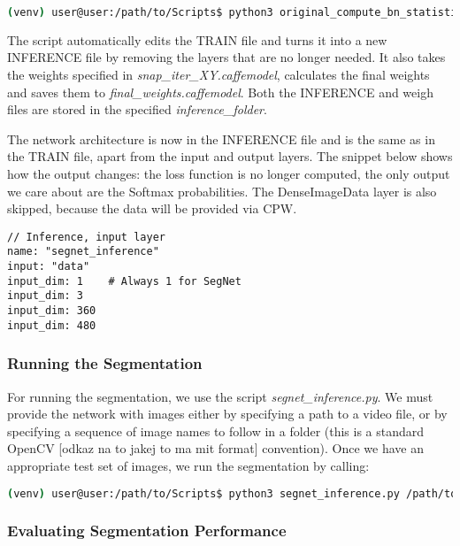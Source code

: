 \begin{lstlisting}[language=bash]
(venv) user@user:/path/to/Scripts$ python3 original_compute_bn_statistics.py /path/to/train.prototxt /path/to/snap_iter_XY.caffemodel /path/to/inference_folder
\end{lstlisting}

The script automatically edits the TRAIN file and turns it into a new INFERENCE file by removing the layers that are no longer needed. It also takes the weights specified in \textit{snap\_iter\_XY.caffemodel}, calculates the final weights and saves them to \textit{final\_weights.caffemodel}. Both the INFERENCE and weigh files are stored in the specified \textit{inference\_folder}.

The network architecture is now in the INFERENCE file and is the same as in the TRAIN file, apart from the input and output layers. The snippet below shows how the output changes: the loss function is no longer computed, the only output we care about are the Softmax probabilities. The DenseImageData layer is also skipped, because the data will be provided via CPW. 

\begin{lstlisting}
// Inference, input layer
name: "segnet_inference"
input: "data"
input_dim: 1	# Always 1 for SegNet
input_dim: 3
input_dim: 360
input_dim: 480
\end{lstlisting}

\subsubsection{Running the Segmentation}

For running the segmentation, we use the script \textit{segnet\_inference.py}. We must provide the network with images either by specifying a path to a video file, or by specifying a sequence of image names to follow in a folder (this is a standard OpenCV [odkaz na to jakej to ma mit format] convention). Once we have an appropriate test set of images, we run the segmentation by calling:

\begin{lstlisting}[language=bash]
(venv) user@user:/path/to/Scripts$ python3 segnet_inference.py /path/to/inference.prototxt /path/to/final_weights.caffemodel /path/to/videofile.avi 
\end{lstlisting}

\subsubsection{Evaluating Segmentation Performance}


